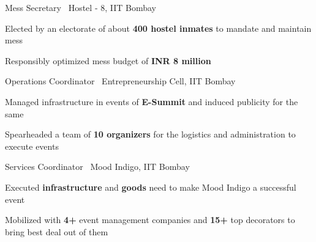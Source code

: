 \begin{cventries}
    \cventry
    {}
    {Mess Secretary \textbar \ Hostel - 8, IIT Bombay}
    {\color{darkgray}{(August'17 - April'18)}}
    {}
    {
      \begin{cvitems}
        \item{Elected by an electorate of about \textbf{400 hostel inmates} to mandate and maintain mess}
        \item{Responsibly optimized mess budget of \textbf{INR 8 million}}
      \end{cvitems}
    }
    \cventry
     {}
     {Operations Coordinator \textbar \ Entrepreneurship Cell, IIT Bombay}
     {\color{darkgray}{(June’17 - February’18)}}
     {}
     {
       \begin{cvitems}
         \item{Managed infrastructure in events of \textbf{E-Summit} and induced publicity for the same}
         \item{Spearheaded a team of \textbf{10 organizers} for the logistics and administration to execute events}
       \end{cvitems}
     }
    \cventry
    {}
    {Services Coordinator \textbar \ Mood Indigo, IIT Bombay}
    {\color{darkgray}{(May’17 - January’18)}}
    {}
    {
      \begin{cvitems}
        \item{Executed \textbf{infrastructure} and \textbf{goods} need to make Mood Indigo a successful event}
        \item{Mobilized with \textbf{4+} event management companies and \textbf{15+} top decorators to bring best deal out of them}
      \end{cvitems}
    }
\end{cventries}
